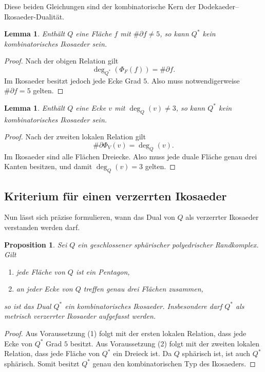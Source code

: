 \documentclass[11pt]{article}
\theoremstyle{plain}
\newtheorem{lemma}[satz]{Lemma}
\newtheorem{proposition}[satz]{Proposition}
\theoremstyle{definition}
\theoremstyle{remark}
\begin{document}
	Diese beiden Gleichungen sind der kombinatorische Kern der Dodekaeder--Ikosaeder-Dualität.
	
	\begin{lemma}\label{lem:dual-kein-ikosaeder-flaeche}
		Enthält \(Q\) eine Fläche \(f\) mit \(\#\partial f\neq 5\), so kann \(Q^\ast\) kein kombinatorisches Ikosaeder sein.
	\end{lemma}
	
	\begin{proof}
		Nach der obigen Relation gilt
		\[
		\deg_{Q^\ast}(\Phi_F(f))=\#\partial f.
		\]
		Im Ikosaeder besitzt jedoch jede Ecke Grad \(5\). Also muss notwendigerweise \(\#\partial f=5\) gelten.
	\end{proof}
	
	\begin{lemma}
		Enthält \(Q\) eine Ecke \(v\) mit \(\deg_Q(v)\neq 3\), so kann \(Q^\ast\) kein kombinatorisches Ikosaeder sein.
	\end{lemma}
	
	\begin{proof}
		Nach der zweiten lokalen Relation gilt
		\[
		\#\partial \Phi_V(v)=\deg_Q(v).
		\]
		Im Ikosaeder sind alle Flächen Dreiecke. Also muss jede duale Fläche genau drei Kanten besitzen, und damit \(\deg_Q(v)=3\) gelten.
	\end{proof}
	
	\subsection{Kriterium für einen verzerrten Ikosaeder}
	
	Nun lässt sich präzise formulieren, wann das Dual von \(Q\) als verzerrter Ikosaeder verstanden werden darf.
	
	\begin{proposition}
		Sei \(Q\) ein geschlossener sphärischer polyedrischer Randkomplex. Gilt
		\begin{enumerate}
			\item jede Fläche von \(Q\) ist ein Pentagon,
			\item an jeder Ecke von \(Q\) treffen genau drei Flächen zusammen,
		\end{enumerate}
		so ist das Dual \(Q^\ast\) ein kombinatorisches Ikosaeder. Insbesondere darf \(Q^\ast\) als metrisch verzerrter Ikosaeder aufgefasst werden.
	\end{proposition}
	
	\begin{proof}
		Aus Voraussetzung (1) folgt mit der ersten lokalen Relation, dass jede Ecke von \(Q^\ast\) Grad \(5\) besitzt. Aus Voraussetzung (2) folgt mit der zweiten lokalen Relation, dass jede Fläche von \(Q^\ast\) ein Dreieck ist. Da \(Q\) sphärisch ist, ist auch \(Q^\ast\) sphärisch. Somit besitzt \(Q^\ast\) genau den kombinatorischen Typ des Ikosaeders.
	\end{proof}
	
\end{document}
